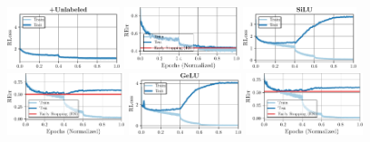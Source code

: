 \begin{figure}[t]
\begin{minipage}[t]{0.19\textwidth}
		\includegraphics[height=1.8cm]{plots_supp_training_curves_500k_loss}
		
		\hspace*{-0.25cm}
		\includegraphics[height=1.8cm]{plots_supp_training_curves_500k_error}
	\end{minipage}
	\begin{minipage}[t]{0.19\textwidth}
		\vspace*{0px}
		
		\includegraphics[height=1.8cm]{plots_supp_training_curves_silu_loss}
		
		\hspace*{-0.25cm}
		\includegraphics[height=1.8cm]{plots_supp_training_curves_silu_error}
	\end{minipage}
	\begin{minipage}[t]{0.19\textwidth}
		\vspace*{0px}
		
		\includegraphics[height=1.8cm]{plots_supp_training_curves_gelu_loss}
		
		\hspace*{-0.25cm}
		\includegraphics[height=1.8cm]{plots_supp_training_curves_gelu_error}
	\end{minipage}
	\begin{minipage}[t]{0.19\textwidth}
		\vspace*{0px}
		

\end{minipage}
\end{figure}
